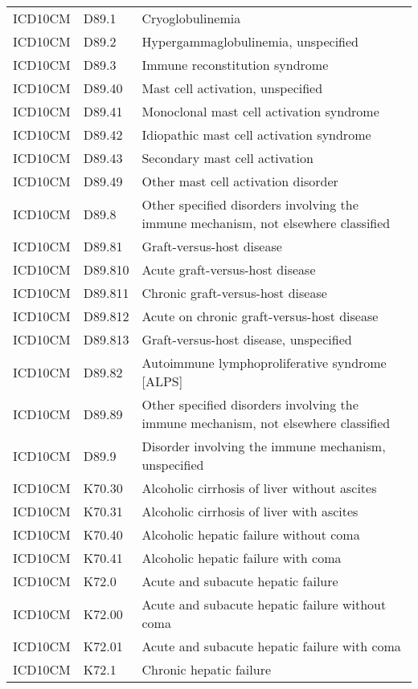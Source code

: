 \begin{table}[ht]
\begin{tabular}{lll}
  ICD10CM & D89.1 & Cryoglobulinemia \\ 
  ICD10CM & D89.2 & Hypergammaglobulinemia, unspecified \\ 
  ICD10CM & D89.3 & Immune reconstitution syndrome \\ 
  ICD10CM & D89.40 & Mast cell activation, unspecified \\ 
  ICD10CM & D89.41 & Monoclonal mast cell activation syndrome \\ 
  ICD10CM & D89.42 & Idiopathic mast cell activation syndrome \\ 
  ICD10CM & D89.43 & Secondary mast cell activation \\ 
  ICD10CM & D89.49 & Other mast cell activation disorder \\ 
  ICD10CM & D89.8 & Other specified disorders involving the immune mechanism, not elsewhere classified \\ 
  ICD10CM & D89.81 & Graft-versus-host disease \\ 
  ICD10CM & D89.810 & Acute graft-versus-host disease \\ 
  ICD10CM & D89.811 & Chronic graft-versus-host disease \\ 
  ICD10CM & D89.812 & Acute on chronic graft-versus-host disease \\ 
  ICD10CM & D89.813 & Graft-versus-host disease, unspecified \\ 
  ICD10CM & D89.82 & Autoimmune lymphoproliferative syndrome [ALPS] \\ 
  ICD10CM & D89.89 & Other specified disorders involving the immune mechanism, not elsewhere classified \\ 
  ICD10CM & D89.9 & Disorder involving the immune mechanism, unspecified \\ 
  ICD10CM & K70.30 & Alcoholic cirrhosis of liver without ascites \\ 
  ICD10CM & K70.31 & Alcoholic cirrhosis of liver with ascites \\ 
  ICD10CM & K70.40 & Alcoholic hepatic failure without coma \\ 
  ICD10CM & K70.41 & Alcoholic hepatic failure with coma \\ 
  ICD10CM & K72.0 & Acute and subacute hepatic failure \\ 
  ICD10CM & K72.00 & Acute and subacute hepatic failure without coma \\ 
  ICD10CM & K72.01 & Acute and subacute hepatic failure with coma \\ 
  ICD10CM & K72.1 & Chronic hepatic failure \\ 

\end{tabular}
\end{table}
